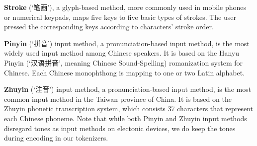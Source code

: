 \noindent \textbf{Stroke} (`笔画'), a glyph-based method, more commonly used in mobile phones or numerical keypads, maps five keys to five basic types of strokes. The user pressed the corresponding keys according to characters' stroke order. 

\noindent \textbf{Pinyin} (`拼音') input method, a pronunciation-based input method, is the most widely used input method among Chinese speakers. It is based on the Hanyu Pinyin (`汉语拼音', meaning Chinese Sound-Spelling) romanization system for Chinese. Each Chinese monophthong is mapping to one or two Latin alphabet. 

\noindent \textbf{Zhuyin} (`注音') input method, a pronunciation-based input method, is the most common input method in the Taiwan province of China. It is based on the Zhuyin phonetic transcription system, which consists 37 characters that represent each Chinese phoneme. Note that while both Pinyin and Zhuyin input methods disregard tones as input methods on electonic devices, we do keep the tones during encoding in our tokenizers.